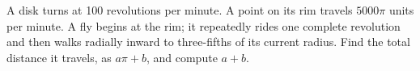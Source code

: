 A disk turns at 100 revolutions per minute. A point on its rim travels $5000\pi$ units per minute. A fly begins at the rim; it repeatedly rides one complete revolution and then walks radially inward to three-fifths of its current radius. Find the total distance it travels, as $a\pi+b$, and compute $a+b$.
